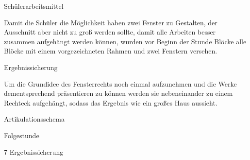 Schülerarbeitsmittel

Damit die Schüler die Möglichkeit haben zwei Fenster zu Gestalten, der Ausschnitt aber nicht zu groß werden sollte, damit alle Arbeiten besser zusammen aufgehängt werden können, wurden vor Beginn der Stunde  Blöcke alle Blöcke mit einem vorgezeichneten Rahmen und zwei Fenstern versehen.

Ergebnissicherung

Um die Grundidee des Fensterrechts noch einmal aufzunehmen und die Werke dementsprechend präsentieren zu können werden sie nebeneinander zu einem Rechteck aufgehängt, sodass das Ergebnis wie ein großes Haus aussieht.

Artikulationsschema




Folgestunde



7 Ergebnissicherung
